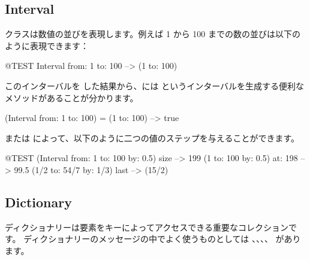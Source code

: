 \documentclass[a4paper,10pt,twoside]{book}
\begin{document}



\subsection{Interval}
 クラスは数値の並びを表現します。例えば 1 から 100 までの数の並びは以下のように表現できます：
\begin{code}{@TEST}
Interval from: 1 to: 100 --> (1 to: 100)
\end{code}

\noindent
このインターバルを  した結果から、には  というインターバルを生成する便利なメソッドがあることが分かります。

\begin{code}{}
(Interval from: 1 to: 100) = (1 to: 100) --> true
\end{code}

 または  によって、以下のように二つの値のステップを与えることができます。

\begin{code}{@TEST}
(Interval from: 1 to: 100 by: 0.5) size --> 199
(1 to: 100 by: 0.5) at: 198 --> 99.5
(1/2 to: 54/7 by: 1/3) last --> (15/2)
\end{code}

\subsection{Dictionary}
ディクショナリーは要素をキーによってアクセスできる重要なコレクションです。
ディクショナリーのメッセージの中でよく使うものとしては 、、、、 があります。
\end{document}
